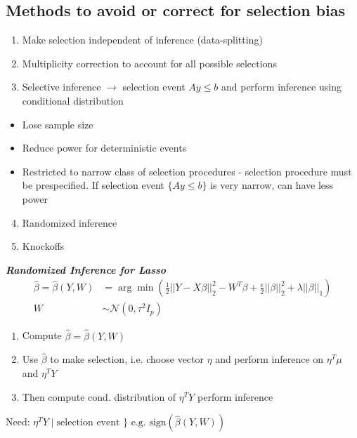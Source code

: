 \subsection{Methods to avoid or correct for selection bias}
\begin{enumerate}
    \item Make selection independent of inference (data-splitting)
    \item Multiplicity correction to account for all possible selections
    \item Selective inference $\rightarrow$ selection event $Ay \le b$ and perform inference using conditional distribution
\end{enumerate}

\begin{itemize}
    \item[1)] Lose sample size
    \item[2)] Reduce power for deterministic events
    \item[3)] Restricted to narrow class of selection procedures - selection procedure must be prespecified. If selection event $\{Ay \le b\}$ is very narrow, can have less power
\end{itemize}

\begin{enumerate}
    \setcounter{enumi}{3}
    \item Randomized inference
    \item Knockoffs
\end{enumerate}

\emph{\textbf{Randomized Inference for Lasso}}
\begin{align*}
    \hat{\beta} = \hat{\beta}(Y, W) &= \arg\min \left( \frac{1}{2} ||Y - X\beta||_2^2 - W^T \beta + \frac{\epsilon}{2} ||\beta||_2^2 + \lambda ||\beta||_1 \right) \\
    W &\sim \mathcal{N}(0, \tau^2 I_p)
\end{align*}

\begin{enumerate}
    \item Compute $\hat{\beta} = \hat{\beta}(Y, W)$
    \item Use $\hat{\beta}$ to make selection, i.e. choose vector $\eta$ and perform inference on $\eta^T \mu$ and $\eta^T Y$
    \item Then compute cond. distribution of $\eta^T Y$ perform inference
\end{enumerate}

\begin{center}
    Need: $\eta^T Y \mid \text{selection event } \} \text{ e.g. } \text{sign}(\hat{\beta}(Y, W))$
\end{center}

